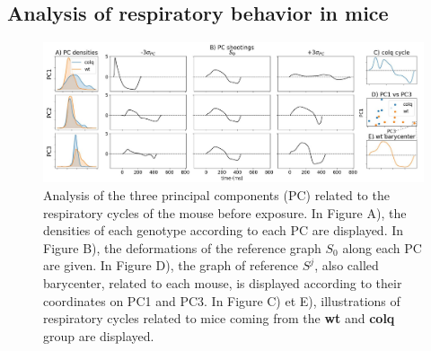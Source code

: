 \subsection{Analysis of respiratory behavior in mice}
\begin{figure}[t]
  \centering
  \includegraphics[width=0.95\linewidth]{"./pictures/exp_1_bis.pdf"}
  \vspace{-1.5em}
  \caption{Analysis of the three principal components (PC) related to the respiratory cycles of the mouse before exposure.
  In Figure A), the densities of each genotype according to each PC are displayed. In Figure B), the deformations of the reference graph $S_0$ along each PC are given. In Figure D), the graph of reference $S^j$, also called barycenter, related to each mouse, is displayed according to their coordinates on PC1 and PC3. In Figure C) et E), illustrations of respiratory cycles related to mice coming from the \textbf{wt} and \textbf{colq} group are displayed.  }
  \label{fig:exp_1_PCA}
\end{figure}

